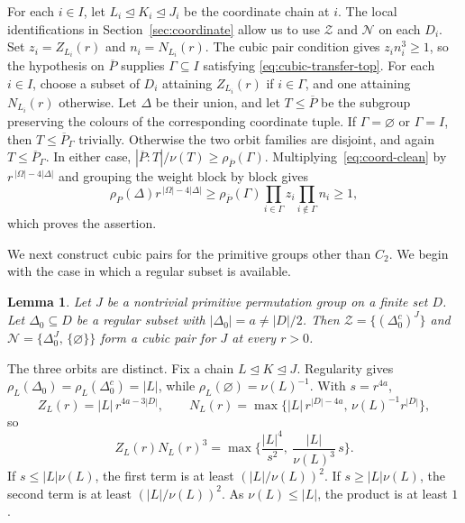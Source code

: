 \documentclass[10pt]{amsart}
\newtheorem{lemma}[theorem]{Lemma}
\theoremstyle{definition}
\renewcommand{\le}{\leqslant}
\renewcommand{\ge}{\geqslant}
\renewcommand{\leq}{\leqslant}
\renewcommand{\geq}{\geqslant}
\let\oldendproof\endproof
\renewenvironment{proof}[1][\proofname]{%
  \oldproof[\bfseries #1]%
}{\oldendproof}
\numberwithin{equation}{section}
\numberwithin{table}{section}
\begin{document}
\begin{proof}
For each $i\in I$, let $L_i\trianglelefteq K_i\trianglelefteq J_i$ be the
coordinate chain at $i$. The local identifications in
Section~\ref{sec:coordinate} allow us to use $\mathcal Z$ and $\mathcal N$ on
each $D_i$. Set $z_i=Z_{L_i}(r)$ and $n_i=N_{L_i}(r)$.
The cubic pair condition gives $z_i n_i^3\geq1$, so the hypothesis on
$\overline P$ supplies $\Gamma\subseteq I$ satisfying
\eqref{eq:cubic-transfer-top}. For each $i\in I$, choose a subset of $D_i$
attaining $Z_{L_i}(r)$ if
$i\in\Gamma$, and one attaining $N_{L_i}(r)$ otherwise. Let $\Delta$ be their
union, and let
$T\leq\overline P$ be the subgroup preserving the colours of the corresponding
coordinate tuple. If $\Gamma=\varnothing$ or $\Gamma=I$, then
$T\leq\overline{P}_\Gamma$ trivially. Otherwise the two orbit families are
disjoint, and again $T\leq\overline{P}_\Gamma$. In either case,
$|\overline{P}:T|/\nu(T)\ge\rho_{\overline{P}}(\Gamma)$. Multiplying~\eqref{eq:coord-clean} by
$r^{\,|\Omega|-4|\Delta|}$ and grouping the weight block by block gives
$$\rho_P(\Delta)r^{\,|\Omega|-4|\Delta|}\ge\rho_{\overline{P}}(\Gamma)\prod_{i\in\Gamma}z_i\prod_{i\notin\Gamma}n_i\ge1,$$
which proves the assertion.
\end{proof}

We next construct cubic pairs for the primitive groups other than $C_2$. We
begin with the case in which a regular subset is available.

\begin{lemma}\label{lem:three-label}
Let $J$ be a nontrivial primitive permutation group on a finite set $D$. Let
$\Delta_0\subseteq D$ be a regular subset with
$|\Delta_0|=a\ne|D|/2$. Then $\mathcal Z=\{(\Delta_0^c)^J\}$ and
$\mathcal N=\{\Delta_0^J,\,\{\varnothing\}\}$ form a cubic pair for $J$ at
every $r>0$.
\end{lemma}

\begin{proof}
The three orbits are distinct. Fix a chain
$L\trianglelefteq K\trianglelefteq J$. Regularity gives
$\rho_L(\Delta_0)=\rho_L(\Delta_0^c)=|L|$, while
$\rho_L(\varnothing)=\nu(L)^{-1}$. With
$s=r^{4a}$,
$$
  Z_L(r)=|L|\,r^{4a-3|D|},\qquad N_L(r)=\max\{|L|\,r^{|D|-4a},\,\nu(L)^{-1}r^{|D|}\},
$$
so
$$
  Z_L(r)N_L(r)^{3}=\max\Big\{\frac{|L|^4}{s^{2}},\ \frac{|L|}{\nu(L)^{3}}\,s\Big\}.
$$
If $s\le |L|\nu(L)$, the first term is at least $(|L|/\nu(L))^2$. If
$s\ge |L|\nu(L)$, the second term is at least $(|L|/\nu(L))^2$. As
$\nu(L)\le |L|$, the product is at least $1$.
\end{proof}
\end{document}
